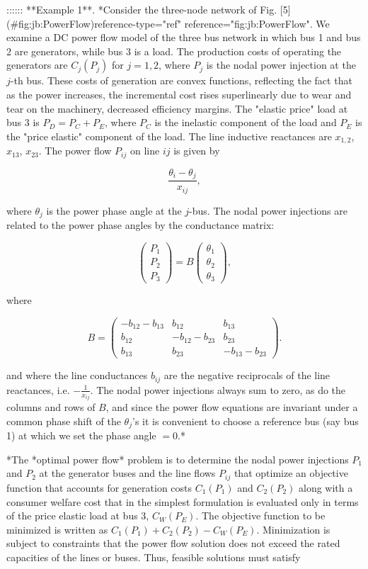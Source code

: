 :::::: **Example 1**. *Consider the three-node network of Fig. [5](#fig:jb:PowerFlow){reference-type="ref" reference="fig:jb:PowerFlow"}. We examine a DC power flow model of the three bus network in which bus 1 and bus 2 are generators, while bus 3 is a load. The production costs of operating the generators are $C_j(P_j)$ for $j=1,2$, where $P_j$ is the nodal power injection at the $j$-th bus. These costs of generation are convex functions, reflecting the fact that as the power increases, the incremental cost rises superlinearly due to wear and tear on the machinery, decreased efficiency margins. The "elastic price" load at bus 3 is $P_D=P_C+P_E$, where $P_C$ is the inelastic component of the load and $P_E$ is the "price elastic" component of the load. The line inductive reactances are $x_{1,2}$, $x_{13}$, $x_{23}$. The power flow $P_{ij}$ on line $ij$ is given by

$$\frac{\theta_i-\theta_j}{x_{ij}}, \label{eq:jb:LineLoads}$$

where $\theta_j$ is the power phase angle at the $j$-bus. The nodal power injections are related to the power phase angles by the conductance matrix:

$$\left(\begin{array}{c} P_1 \\ P_2\\ P_3 \end{array} \right)  = B 
\left( \begin{array}{c} \theta_1 \\ \theta_2 \\ \theta_3 \end{array} \right), \label{eq:jb:conductance}$$

where

$$B = 
\left( \begin{array}{ccc} -b_{12}-b_{13} & b_{12} & b_{13}\\ b_{12} & -b_{12}-b_{23} & b_{23}\\ b_{13} & b_{23} & -b_{13}-b_{23} 
\end{array}\right).$$

and where the line conductances $b_{ij}$ are the negative reciprocals of the line reactances, i.e. $-\frac{1}{x_{ij}}$. The nodal power injections always sum to zero, as do the columns and rows of $B$, and since the power flow equations are invariant under a common phase shift of the $\theta_j$'s it is convenient to choose a reference bus (say bus 1) at which we set the phase angle $=0$.*

*The *optimal power flow* problem is to determine the nodal power injections $P_1$ and $P_2$ at the generator buses and the line flows $P_{ij}$ that optimize an objective function that accounts for generation costs $C_1(P_1)$ and $C_2(P_2)$ along with a consumer welfare cost that in the simplest formulation is evaluated only in terms of the price elastic load at bus 3, $C_W(P_E)$. The objective function to be minimized is written as $C_1(P_1)+C_2(P_2)-C_W(P_E)$. Minimization is subject to constraints that the power flow solution does not exceed the rated capacities of the lines or buses. Thus, feasible solutions must satisfy

